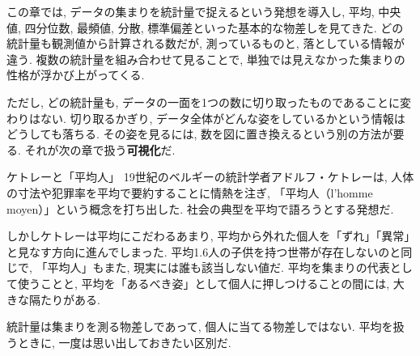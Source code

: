     この章では, データの集まりを統計量で捉えるという発想を導入し, 平均, 中央値, 四分位数, 最頻値, 分散, 標準偏差といった基本的な物差しを見てきた.
    どの統計量も観測値から計算される数だが, 測っているものと, 落としている情報が違う.
    複数の統計量を組み合わせて見ることで, 単独では見えなかった集まりの性格が浮かび上がってくる.

    ただし, どの統計量も, データの一面を1つの数に切り取ったものであることに変わりはない.
    切り取るかぎり, データ全体がどんな姿をしているかという情報はどうしても落ちる.
    その姿を見るには, 数を図に置き換えるという別の方法が要る.
    それが次の章で扱う\textbf{可視化}だ.

  \begin{mybox}{ケトレーと「平均人」}
    19世紀のベルギーの統計学者アドルフ・ケトレーは, 人体の寸法や犯罪率を平均で要約することに情熱を注ぎ, 「平均人（l'homme moyen）」という概念を打ち出した.\footnotemark
    社会の典型を平均で語ろうとする発想だ.

    しかしケトレーは平均にこだわるあまり, 平均から外れた個人を「ずれ」「異常」と見なす方向に進んでしまった.
    平均1.6人の子供を持つ世帯が存在しないのと同じで, 「平均人」もまた, 現実には誰も該当しない値だ.
    平均を集まりの代表として使うことと, 平均を「あるべき姿」として個人に押しつけることの間には, 大きな隔たりがある.

    統計量は集まりを測る物差しであって, 個人に当てる物差しではない.
    平均を扱うときに, 一度は思い出しておきたい区別だ.
  \end{mybox}
